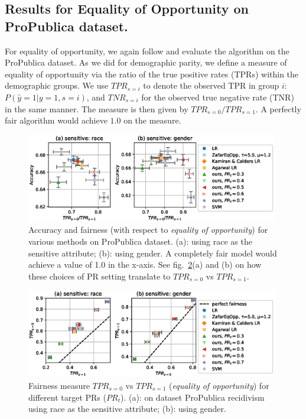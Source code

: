 \subsection{Results for Equality of Opportunity on ProPublica dataset.}\label{sssec:eqoppresults}
%
For equality of opportunity,
we again follow \citet{zafar2017fairnesstreatment} and evaluate the algorithm on the ProPublica dataset.
As we did for demographic parity,
we define a measure of equality of opportunity via the ratio of the true positive rates (TPRs) within the demographic groups.
We use $\mathit{TPR}_{s=i}$ to denote the observed TPR in group $i$: $P(\hat{y}=1|y=1, s=i)$,
and $\mathit{TNR}_{s=i}$ for the observed true negative rate (TNR) in the same manner.
The measure is then given by $\mathit{TPR}_{s=0} / \mathit{TPR}_{s=1}$.
A perfectly fair algorithm would achieve $1.0$ on the measure.%
\begin{figure}[t]
  \centering
  \includegraphics[width=0.98\textwidth]{paper1/figures/propublica_opp_box_with_agarwal.eps}
  \caption{Accuracy and fairness (with respect to \emph{equality of opportunity}) for various methods on ProPublica dataset.
    (a): using race as the sensitive attribute; (b): using gender.
    A completely fair model would achieve a value of 1.0 in the x-axis.
    See fig.~\ref{fig:propublica_opp_scatter_tpr}(a) and (b) on how these choices of PR setting translate to
    $\mathit{TPR}_{s=0}$ vs $\mathit{TPR}_{s=1}$. %
  }%
  \label{fig:propublica_opp_box}
\end{figure}%
\begin{figure}[!ht]
  \centering
  \includegraphics[width=0.98\textwidth]{paper1/figures/propublica_opp_scatter_tpr.eps}
  \caption{%
    Fairness measure $\mathit{TPR}_{s=0}$ vs $\mathit{TPR}_{s=1}$ (\emph{equality of opportunity}) for different target PRs ($\mathit{PR}_t$).
    (a): on dataset ProPublica recidivism using race as the sensitive attribute;
    (b): using gender.
  }%
  \label{fig:propublica_opp_scatter_tpr}
\end{figure}%

